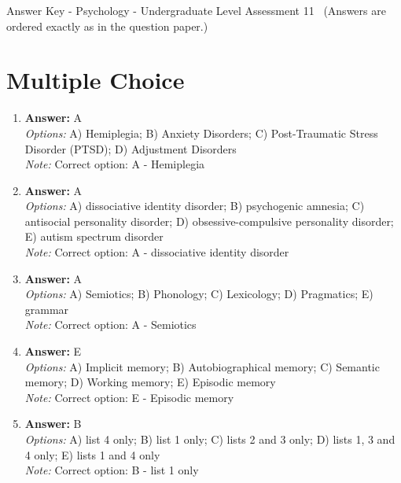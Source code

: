 \documentclass[12pt]{article}
\begin{document}
\begin{center}
Answer Key - Psychology - Undergraduate Level Assessment 11 \
\small (Answers are ordered exactly as in the question paper.)
\end{center}

\section*{Multiple Choice}
\begin{enumerate}[label=\arabic*.]
\item \textbf{Answer:} A
\\ \textit{Options:} A) Hemiplegia; B) Anxiety Disorders; C) Post-Traumatic Stress Disorder (PTSD); D) Adjustment Disorders
\\ \textit{Note:} Correct option: A - Hemiplegia
\item \textbf{Answer:} A
\\ \textit{Options:} A) dissociative identity disorder; B) psychogenic amnesia; C) antisocial personality disorder; D) obsessive-compulsive personality disorder; E) autism spectrum disorder
\\ \textit{Note:} Correct option: A - dissociative identity disorder
\item \textbf{Answer:} A
\\ \textit{Options:} A) Semiotics; B) Phonology; C) Lexicology; D) Pragmatics; E) grammar
\\ \textit{Note:} Correct option: A - Semiotics
\item \textbf{Answer:} E
\\ \textit{Options:} A) Implicit memory; B) Autobiographical memory; C) Semantic memory; D) Working memory; E) Episodic memory
\\ \textit{Note:} Correct option: E - Episodic memory
\item \textbf{Answer:} B
\\ \textit{Options:} A) list 4 only; B) list 1 only; C) lists 2 and 3 only; D) lists 1, 3 and 4 only; E) lists 1 and 4 only
\\ \textit{Note:} Correct option: B - list 1 only
\end{enumerate}
\end{document}
